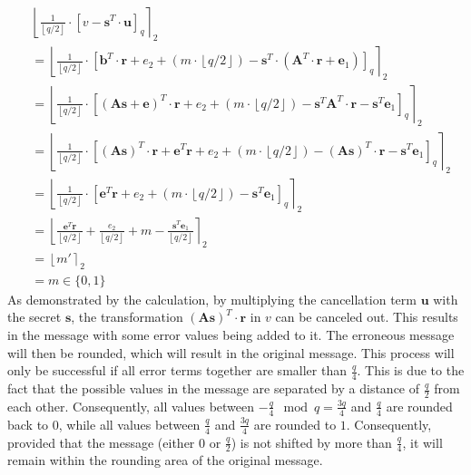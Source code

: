 \begin{align*}
   & \left\lfloor \frac{1}{\left\lfloor q/2\right\rfloor}\cdot \left[v-\textbf{s}^T \cdot \textbf{u}\right]_q\right\rceil _2                                                                                                                                        \\
   & = \left\lfloor \frac{1}{\left\lfloor q/2\right\rfloor}\cdot \left[\textbf{b}^T \cdot \textbf{r} + e_2 + (m\cdot \left\lfloor q/2\right\rfloor)-\textbf{s}^T \cdot (\textbf{A}^T \cdot \textbf{r} + \textbf{e}_1)\right]_q \right\rceil _2                      \\
   & = \left\lfloor \frac{1}{\left\lfloor q/2\right\rfloor}\cdot \left[(\textbf{As}+\textbf{e})^T \cdot \textbf{r} + e_2 + (m\cdot \left\lfloor q/2\right\rfloor)-\textbf{s}^T \textbf{A}^T \cdot \textbf{r} - \textbf{s}^T \textbf{e}_1\right]_q \right\rceil _2   \\
   & = \left\lfloor \frac{1}{\left\lfloor q/2\right\rfloor}\cdot \left[(\textbf{As})^T \cdot \textbf{r} + \textbf{e}^T\textbf{r}+ e_2 + (m\cdot \left\lfloor q/2\right\rfloor)-(\textbf{As})^T \cdot \textbf{r} - \textbf{s}^T \textbf{e}_1\right]_q\right\rceil _2 \\
   & = \left\lfloor \frac{1}{\left\lfloor q/2\right\rfloor}\cdot \left[\textbf{e}^T\textbf{r}+ e_2 + (m\cdot \left\lfloor q/2\right\rfloor)- \textbf{s}^T \textbf{e}_1\right]_q\right\rceil _2                                                                      \\
   & = \left\lfloor \frac{\textbf{e}^T\textbf{r}}{\left\lfloor q/2\right\rfloor}+ \frac{e_2 }{\left\lfloor q/2\right\rfloor}+ m - \frac{\textbf{s}^T \textbf{e}_1}{\left\lfloor q/2\right\rfloor}\right\rceil _2                                                    \\
   & = \left\lfloor m' \right\rceil _2                                                                                                                                                                                                                              \\
   & = m \in \{0,1\}
\end{align*}
As demonstrated by the calculation, by multiplying the cancellation term $\textbf{u}$ with the secret $\textbf{s}$, the transformation $(\textbf{As})^T \cdot \textbf{r}$ in $v$ can be canceled out. This results in the message with some error values being added to it. The erroneous message will then be rounded, which will result in the original message. This process will only be successful if all error terms together are smaller than $\frac{q}{4}$. This is due to the fact that the possible values in the message are separated by a distance of $\frac{q}{2}$ from each other. Consequently, all values between $-\frac{q}{4}\mod q=\frac{3q}{4}$ and $\frac{q}{4}$ are rounded back to $0$, while all values between $\frac{q}{4}$ and $\frac{3q}{4}$ are rounded to $1$. Consequently, provided that the message (either $0$ or $\frac{q}{2}$) is not shifted by more than $\frac{q}{4}$, it will remain within the rounding area of the original message.

